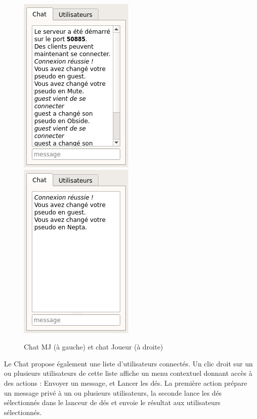 \begin{figure}[h!]
	\centering
	\includegraphics[scale=0.5]{img/chat_mj.jpg}
	\hspace{10 mm}
	\includegraphics[scale=0.5]{img/chat_player.jpg}
	\caption{Chat MJ (à gauche) et chat Joueur (à droite)}
\end{figure}

Le Chat propose également une liste d'utilisateurs connectés. Un clic droit sur un ou plusieurs utilisateurs de cette liste affiche un menu contextuel donnant accès à des actions : Envoyer un message, et Lancer les dés.
La première action prépare un message privé à un ou plusieurs utilisateurs, la seconde lance les dés sélectionnés dans le lanceur de dés et envoie le résultat aux utilisateurs sélectionnés.


